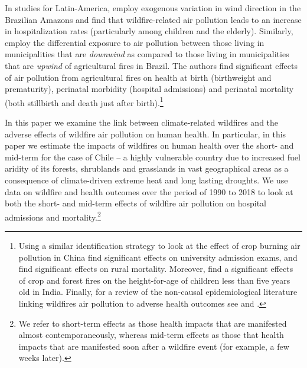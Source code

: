 \documentclass[11pt]{article}
\begin{document}
\begin{spacing}{1.3}
In studies for Latin-America, \citet{rocha2022winds} employ exogenous variation in wind direction in the Brazilian Amazons and find that wildfire-related air pollution leads to an increase in hospitalization rates (particularly among children and the elderly). Similarly, \cite{RangelVogl2019} employ the differential exposure to air pollution between those living in municipalities that are \textit{downwind} as compared to those living in municipalities that are \textit{upwind} of agricultural fires in Brazil. The authors find significant effects of air pollution from agricultural fires on health at birth (birthweight and prematurity), perinatal morbidity (hospital admissions) and perinatal mortality (both stillbirth and death just after birth).\footnote{Using a similar identification strategy to look at the effect of crop burning air pollution in China \cite{zivin2020unintended} find significant effects on university admission exams, and \cite{he2020straw} find significant effects on rural mortality. Moreover, \cite{Singh2022stubble} find a significant effects of crop and forest fires on the height-for-age of children less than five years old in India. Finally, for a review of the non-causal epidemiological literature linking wildfires air pollution to adverse health outcomes see \cite{reid2016critical} and \cite{cascio2018wildland}.}

In this paper we examine the link between climate-related wildfires and the adverse effects of wildfire air pollution on human health. In particular, in this paper we estimate the impacts of wildfires on human health over the short- and mid-term for the case of Chile -- a highly vulnerable country due to increased fuel aridity of its forests, shrublands and grasslands in vast geographical areas as a consequence of climate-driven extreme heat and long lasting droughts. We use data on wildfire and health outcomes over the period of 1990 to 2018 to look at both the short- and mid-term effects of wildfire air pollution on hospital admissions and mortality.\footnote{We refer to short-term effects as those health impacts that are manifested almost contemporaneously, whereas mid-term effects as those that health impacts that are manifested soon after a wildfire event (for example, a few weeks later).}


\end{spacing}
\end{document}
